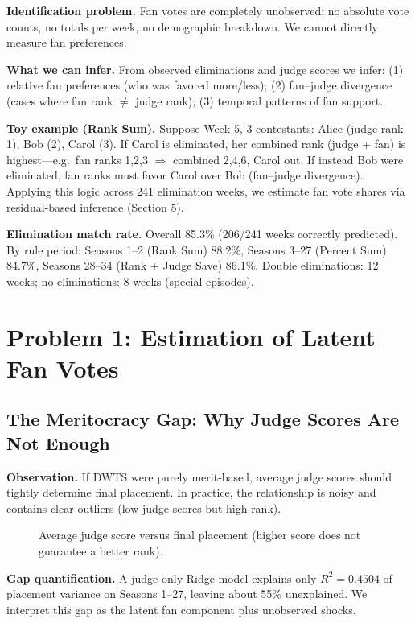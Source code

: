 \documentclass{mcmthesis}
\begin{document}
\textbf{Identification problem.}
Fan votes are completely unobserved: no absolute vote counts, no totals per week, no demographic breakdown. We cannot directly measure fan preferences.

\textbf{What we can infer.}
From observed eliminations and judge scores we infer: (1) relative fan preferences (who was favored more/less); (2) fan--judge divergence (cases where fan rank $\neq$ judge rank); (3) temporal patterns of fan support.

\textbf{Toy example (Rank Sum).}
Suppose Week 5, 3 contestants: Alice (judge rank 1), Bob (2), Carol (3). If Carol is eliminated, her combined rank (judge + fan) is highest---e.g.\ fan ranks 1,2,3 $\Rightarrow$ combined 2,4,6, Carol out. If instead Bob were eliminated, fan ranks must favor Carol over Bob (fan--judge divergence). Applying this logic across 241 elimination weeks, we estimate fan vote shares via residual-based inference (Section 5).

\textbf{Elimination match rate.}
Overall 85.3\% (206/241 weeks correctly predicted). By rule period: Seasons 1--2 (Rank Sum) 88.2\%, Seasons 3--27 (Percent Sum) 84.7\%, Seasons 28--34 (Rank + Judge Save) 86.1\%. Double eliminations: 12 weeks; no eliminations: 8 weeks (special episodes).

\fi
\section{Problem 1: Estimation of Latent Fan Votes}

\subsection{The Meritocracy Gap: Why Judge Scores Are Not Enough}
\textbf{Observation.} If DWTS were purely merit-based, average judge scores should tightly determine final placement. In practice, the relationship is noisy and contains clear outliers (low judge scores but high rank).

\begin{figure}[htbp]
\centering
\caption{Average judge score versus final placement (higher score does not guarantee a better rank).}
\end{figure}

\textbf{Gap quantification.} A judge-only Ridge model explains only $R^2 = 0.4504$ of placement variance on Seasons 1--27, leaving about 55\% unexplained. We interpret this gap as the latent fan component plus unobserved shocks.
\end{document}
